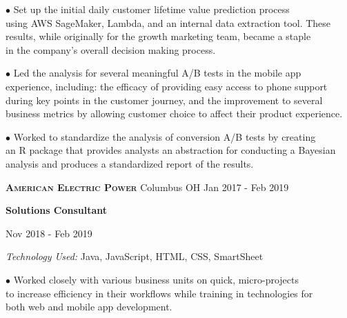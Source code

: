 \documentclass[12pt]{article}
\newcommand\tab[1][1cm]{\hspace*{#1}}
\begin{document}
\begin{flushleft}
    \tab[1.25cm] $\bullet$ Set up the initial daily customer lifetime value prediction process \\
    \tab[1.6cm] using AWS SageMaker, Lambda, and an internal data extraction tool. These \\
    \tab[1.6cm] results, while originally for the growth marketing team, became a staple \\
    \tab[1.6cm] in the company's overall decision making process.
    \vspace*{0.5mm}

    \tab[1.25cm] $\bullet$ Led the analysis for several meaningful A/B tests in the mobile app \\
    \tab[1.6cm] experience, including: the efficacy of providing easy access to phone support \\
    \tab[1.6cm] during key points in the customer journey, and the improvement to several \\
    \tab[1.6cm] business metrics by allowing customer choice to affect their product experience. \\
    \vspace*{0.5mm}

    \tab[1.24cm] $\bullet$ Worked to standardize the analysis of conversion A/B tests by creating \\
    \tab[1.6cm] an R package that provides analysts an abstraction for conducting a Bayesian \\
    \tab[1.6cm] analysis and produces a standardized report of the results. \\
    \medskip

    \textsc{\textbf{American Electric Power}} \tab \small {Columbus OH} \hfill \small {Jan 2017 - Feb 2019} \\
    \smallskip

    \tab \textbf{Solutions Consultant} \hfill {\footnotesize Nov 2018 - Feb 2019 \par}
    \tab[1.25cm] \textit{Technology Used:} Java, JavaScript, HTML, CSS, SmartSheet \\
    \vspace*{0.5mm}

    \tab[1.25cm] $\bullet$ Worked closely with various business units on quick, micro-projects \\
    \tab[1.6cm] to increase efficiency in their workflows while training in technologies for \\
    \tab[1.6cm] both web and mobile app development. \\
    \medskip


\end{flushleft}
\end{document}

